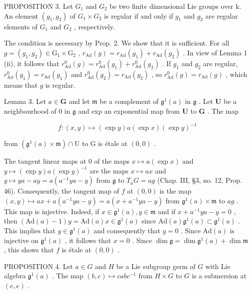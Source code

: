 PROPOSITION 3. Let \(G_{1}\) and \(G_{2}\) be two finite dimensional Lie groups over k. An element \((g_{1}, g_{2})\) of \(G_{1} \times G_{2}\) is regular if and only if \(g_{1}\) and \(g_{2}\) are regular elements of \(G_{1}\) and \(G_{2}\) , respectively.

The condition is necessary by Prop. 2. We show that it is sufficient. For all \(g = (g_{1}, g_{2}) \in \mathrm{G}_{1} \times \mathrm{G}_{2}\) , \(r_{\mathrm{Ad}}(g) = r_{\mathrm{Ad}}(g_{1}) + r_{\mathrm{Ad}}(g_{2})\) . In view of Lemma 1 (ii), it follows that \(r_{\mathrm{Ad}}^{0}(g) = r_{\mathrm{Ad}}^{0}(g_{1}) + r_{\mathrm{Ad}}^{0}(g_{2})\) . If \(g_{1}\) and \(g_{2}\) are regular, \(r_{\mathrm{Ad}}^{0}(g_{1}) = r_{\mathrm{Ad}}(g_{1})\) and \(r_{\mathrm{Ad}}^{0}(g_{2}) = r_{\mathrm{Ad}}(g_{2})\) , so \(r_{\mathrm{Ad}}^{0}(g) = r_{\mathrm{Ad}}(g)\) , which means that \(g\) is regular.

Lemma 3. Let \(a \in \mathbf{G}\) and let \(\mathfrak{m}\) be a complement of \(\mathfrak{g}^1(a)\) in \(\mathfrak{g}\) . Let \(\mathbf{U}\) be a neighbourhood of 0 in \(\mathfrak{g}\) and exp an exponential map from \(\mathbf{U}\) to \(\mathbf{G}\) . The map

\[
f: (x, y) \mapsto (\exp y) a (\exp x) (\exp y) ^ {- 1}
\]

from \((\mathfrak{g}^1 (a)\times \mathfrak{m})\cap \mathrm{U}\) to G is étale at \((0,0)\) .

The tangent linear maps at 0 of the maps \(x \mapsto a(\exp x)\) and \(y \mapsto (\exp y)a(\exp y)^{-1}\) are the maps \(x \mapsto ax\) and \(y \mapsto ya - ay = a(a^{-1}ya - y)\) from \(\mathfrak{g}\) to \(T_aG = ag\) (Chap. III, §3, no. 12, Prop. 46). Consequently, the tangent map of \(f\) at \((0,0)\) is the map \((x,y) \mapsto ax + a(a^{-1}ya - y) = a(x + a^{-1}ya - y)\) from \(\mathfrak{g}^1(a) \times \mathfrak{m}\) to \(ag\) . This map is injective. Indeed, if \(x \in \mathfrak{g}^1(a), y \in \mathfrak{m}\) and if \(x + a^{-1}ya - y = 0\) , then \((\mathrm{Ad}(a) - 1)y = \mathrm{Ad}(a)x \in \mathfrak{g}^1(a)\) since \(\mathrm{Ad}(a)\mathfrak{g}^1(a) \subset \mathfrak{g}^1(a)\) . This implies that \(y \in \mathfrak{g}^1(a)\) and consequently that \(y = 0\) . Since \(\mathrm{Ad}(a)\) is injective on \(\mathfrak{g}^1(a)\) , it follows that \(x = 0\) . Since \(\dim \mathfrak{g} = \dim \mathfrak{g}^1(a) + \dim \mathfrak{m}\) , this shows that \(f\) is étale at \((0,0)\) .

PROPOSITION 4. Let \(a \in G\) and \(H\) be a Lie subgroup germ of \(G\) with Lie algebra \(\mathfrak{g}^1(a)\) . The map \((b, c) \mapsto cabc^{-1}\) from \(H \times G\) to \(G\) is a submersion at \((e, e)\) .

